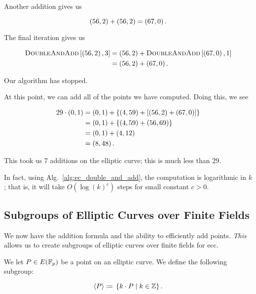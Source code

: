 \begin{example}
\noindent
Another addition gives us

\begin{equation}
    \left( 56,2 \right) + \left( 56,2 \right) = \left( 67,0 \right).
\end{equation}

\noindent
The final iteration gives us

\begin{align}
    \textsc{DoubleAndAdd}\left[ \left( 56,2 \right), 3 \right]
        &= \left( 56,2 \right) + \textsc{DoubleAndAdd}\left[ \left( 67,0 \right), 1 \right]
            \nonumber\\
    &= \left( 56,2 \right) + \left( 67,0 \right).
\end{align}

\noindent
Our algorithm has stopped.

At this point, we can add all of the points we have computed.
Doing this, we see

\begin{align}
    29\cdot\left( 0,1 \right) &=
            \left( 0,1 \right) + \left\{ \left( 4,59 \right) + \left[ 
                \left( 56,2 \right) + \left( 67,0 \right) \right] \right\}
        \nonumber\\
    &= \left( 0,1 \right) + \left\{ \left( 4,59 \right) + \left( 56,69 \right) \right\}
        \nonumber\\
    &= \left( 0,1 \right) + \left( 4,12 \right)
        \nonumber\\
    &= \left( 8,48 \right).
\end{align}

\noindent
This took us 7 additions on the \gls{elliptic curve};
this is much less than 29.
\end{example}

In fact, using Alg.~\ref{alg:ec_double_and_add},
the computation is logarithmic in $k$;
that is, it will take $O(\log(k)^{c})$ steps for small constant $c>0$.


\subsection{Subgroups of Elliptic Curves over Finite Fields}
\label{ssec:ec_subgroups}

We now have the addition formula
and the ability to efficiently add points.
\emph{This} allows us to create \glspl{subgroup} of \glspl{elliptic curve}
over \glspl{finite field} for \gls{ecc}.

We let $P\in E(\mathbb{F}_{p})$ be a point on an \gls{elliptic curve}.
We define the following \gls{subgroup}:

\begin{equation}
    \left\langle P \right\rangle \coloneqq{} \left\{ k\cdot P \mid k\in\mathbb{Z} \right\}.
\end{equation}

